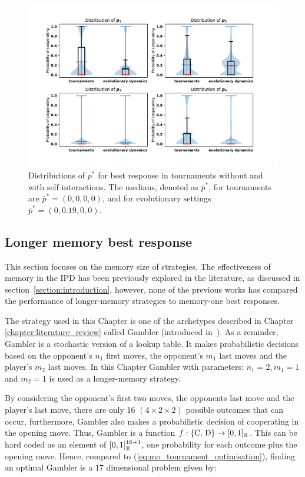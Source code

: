 \begin{figure}[!htbp]
    \centering
    \includegraphics[width=.9\textwidth]{src/chapters/05/paper/memory-size-in-the-prisoners-dilemma/img/behaviour_violin_plots.pdf}
    \caption{Distributions of \(p^*\) for best response in tournaments without
     and with self interactions. The medians, denoted as \(\bar{p}^*\), for
     tournaments are \(\bar{p}^* = (0, 0, 0, 0)\), and for evolutionary settings
     \(\bar{p}^* = (0, 0.19, 0, 0)\).}
    \label{fig:behaviour_violin_plots}
\end{figure}

\subsection{Longer memory best response}\label{subsection:longer_memory_best_response}

This section focuses on the memory size of strategies. The effectiveness of
memory in the IPD has been previously explored in the literature, as
discussed in section~\ref{section:introduction}, however, none of the
previous works has compared the performance of longer-memory strategies to
memory-one best responses.

The strategy used in this Chapter is one of the archetypes described in Chapter
\ref{chapter:literature_review} called Gambler (introduced
in~\cite{Harper2017}). As a reminder, Gambler is a stochastic version of a lookup
table. It makes probabilistic decisions based on the opponent's \(n_1\) first
moves, the opponent's \(m_1\) last moves and the player's \(m_2\) last moves.
In this Chapter Gambler with parameters: $n_1 = 2, m_1 = 1$ and $m_2
= 1$ is used as a longer-memory strategy.

By considering the opponent's first two moves, the opponents last move and the
player's last move, there are only 16 $(4 \times 2 \times 2)$ possible outcomes
that can occur, furthermore, Gambler also makes a probabilistic decision of
cooperating in the opening move. Thus, Gambler is a function \(f: \{\text{C,
D}\} \rightarrow [0, 1]_{\mathbb{R}}\). This can be hard coded as an element
of \([0, 1]_{\mathbb{R}} ^ {16 + 1}\), one probability for each outcome plus the opening
move. Hence, compared to (\ref{eq:mo_tournament_optimisation}), finding an
optimal Gambler is a 17 dimensional problem given by:

